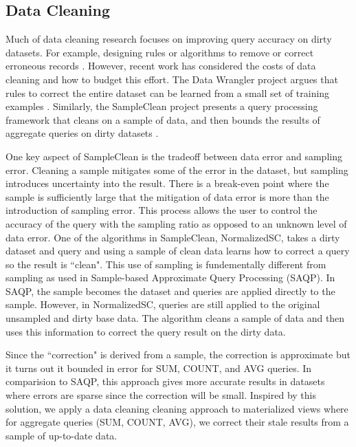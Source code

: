 \subsection{Data Cleaning}
Much of data cleaning research focuses on improving query accuracy on dirty datasets.
For example, designing rules or algorithms to remove or correct erroneous records \cite{rahm2000data}.
However, recent work has considered the costs of data cleaning and how to budget this effort.
The Data Wrangler project argues that rules to correct the entire dataset can be learned from a small set of training examples \cite{kandel2011wrangler}.
Similarly, the SampleClean project presents a query processing framework that cleans on a sample of data, and then bounds the results of aggregate queries on dirty datasets \cite{wang1999sample}.

One key aspect of SampleClean is the tradeoff between data error and sampling error.
Cleaning a sample mitigates some of the error in the dataset, but sampling introduces uncertainty into the result.
There is a break-even point where the sample is sufficiently large that the mitigation of data error is more than the introduction
of sampling error.
This process allows the user to control the accuracy of the query with the sampling ratio as opposed to an unknown level of data error.
One of the algorithms in SampleClean, NormalizedSC, takes a dirty dataset and query and using a sample of clean data learns how
to correct a query so the result is ``clean".
This use of sampling is fundementally different from sampling as used in Sample-based Approximate Query Processing (SAQP).
In SAQP, the sample becomes the dataset and queries are applied directly to the sample.
However, in NormalizedSC, queries are still applied to the original unsampled and dirty base data.
The algorithm cleans a sample of data and then uses this information to correct the query result on the dirty data.

Since the ``correction" is derived from a sample, the correction is approximate but it turns out it bounded in error for SUM, COUNT, and AVG queries.
In comparision to SAQP, this approach gives more accurate results in datasets where errors are sparse since the correction will be small.
Inspired by this solution, we apply a data cleaning cleaning approach to materialized views where for aggregate queries (SUM, COUNT, AVG), we correct their stale results from a sample of up-to-date data.

